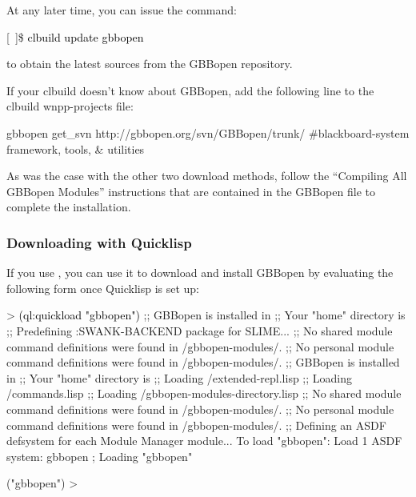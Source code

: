 \documentclass[10pt,twoside,english,pdftex]{article}
\begin{document}
At any later time, you can issue the command:
%
\W\supp
\begin{example}
\textcolor{darkergray}{%
  [~]\$ \textcolor{black}{clbuild update gbbopen}}
\end{example}
%
to obtain the latest sources from the GBBopen repository.

If your clbuild doesn't know about GBBopen, add the following line to the
clbuild wnpp-projects file:
%
\W\supp
\begin{example}
  gbbopen get_svn http://gbbopen.org/svn/GBBopen/trunk/ #blackboard-system framework, tools, \& utilities
\end{example}

As was the case with the other two download methods, follow the ``Compiling
All GBBopen Modules'' instructions that are contained in the GBBopen
 file to complete the installation.


\subsubsection*{Downloading with Quicklisp}

%
%
If you use , you can use
it to download and install GBBopen by evaluating the following form once
Quicklisp is set up:
%
\W\supp
\begin{example}
\textcolor{darkergray}{%
  > \textcolor{black}{(ql:quickload "gbbopen")}
  ;; GBBopen is installed in 
  ;; Your "home" directory is 
  ;; Predefining :SWANK-BACKEND package for SLIME...
  ;; No shared module command definitions were found in /gbbopen-modules/.
  ;; No personal module command definitions were found in /gbbopen-modules/.
  ;; GBBopen is installed in 
  ;; Your "home" directory is 
  ;;     Loading /extended-repl.lisp
  ;;     Loading /commands.lisp
  ;;     Loading /gbbopen-modules-directory.lisp
  ;; No shared module command definitions were found in /gbbopen-modules/.
  ;; No personal module command definitions were found in /gbbopen-modules/.
  ;; Defining an ASDF defsystem for each Module Manager module...
  To load "gbbopen":
    Load 1 ASDF system:
      gbbopen
  ; Loading "gbbopen"

  ("gbbopen")
  >}
\end{example}
\end{document}
